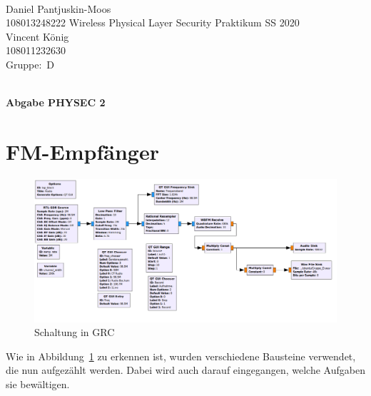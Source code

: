 \documentclass[12pt,a4paper]{article}
\newcommand{\student}{Daniel Pantjuskin-Moos\\ 108013248222 } %
\newcommand{\partner}{Vincent König\\ 108011232630} %
\newcommand{\group}{D} %
\newcommand{\hwheadtwo}{$ $
  \vspace{-2cm}
  
\noindent \student \qquad \qquad  Wireless Physical Layer Security Praktikum \hfill SS 2020 \\
\noindent \partner \\
\noindent Gruppe:~\group\\
$ $

  
\begin{center}    
{\Large \bf Abgabe PHYSEC 2}
\end{center}
}
\begin{document}
\hwheadtwo

\section{FM-Empfänger}



 
\begin{figure}[hbt!]
\centering
	\includegraphics[width=1\textwidth ]
	{Bilder/Aufgabe1-gesamt-grc.png}
	\caption{Schaltung in GRC}
	\label{fig:Label1}
\end{figure}

Wie in Abbildung~\ref{fig:Label1} zu erkennen ist, wurden 
verschiedene Bausteine verwendet, die nun aufgezählt werden. 
Dabei wird auch darauf eingegangen, welche Aufgaben sie bewältigen.
\end{document}
